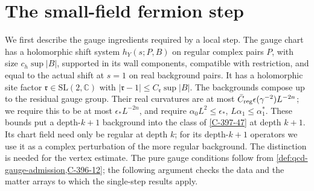 \documentclass[11pt,letterpaper,reqno]{amsart}
\theoremstyle{definition}
\theoremstyle{remark}
\begin{document}
\section{The small-field fermion step}

We first describe the gauge ingredients required by a local step.
The gauge chart has a holomorphic shift system
$h_Y(s;P,B)$ on regular complex pairs $P$, with size
$c_h\sup|B|$, supported in its wall components, compatible with
restriction, and equal to the actual shift at $s=1$ on real
background pairs.  It has a holomorphic site factor
$\mathfrak r\in\mathrm{SL}(2,\mathbb C)$ with
$|\mathfrak r-1|\le C_{\mathfrak r}\sup|B|$.  The backgrounds
compose up to the residual gauge group.  Their real curvatures
are at most $\bar C_{\rm reg}\epsilon(\gamma^{-2})L^{-2n}$;
we require this to be at most $\epsilon_*L^{-2n}$, and require
$\alpha_0L^2\le\epsilon_*$, $L\alpha_1\le\alpha_1^*$.
These bounds put a depth-$k+1$ background into the class of
\cref{C-397-47} at depth $k+1$.  Its chart field need only be
regular at depth $k$; for its depth-$k+1$ operators we use it
as a complex perturbation of the more regular background.
The distinction is needed for the vertex estimate.
The pure gauge conditions follow from
\cref{def:qcd-gauge-admission,C-396-12}; the following argument checks the
data and the matter arrays to which the single-step results apply.
\end{document}
